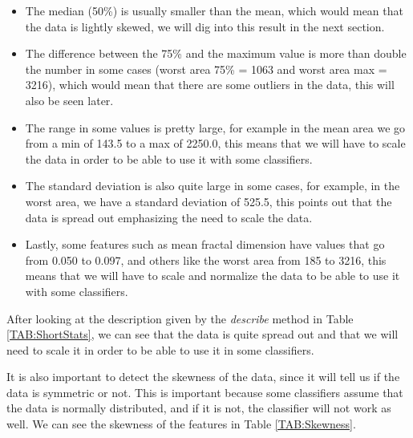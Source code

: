 \begin{itemize}
    \item The median (50\%) is usually smaller 
    than the mean, which would mean that the data is lightly skewed, we will dig into this result in the next section.
    \item The difference between the 75\% and the maximum value is more than double the number in some cases (worst area 75\% = 1063 and worst area max = 3216), which would mean that there are some outliers in the data, this will also be seen later.
    \item The range in some values is pretty large, for example in the mean area we go from a min of 143.5 to a max of 2250.0, this means that we will have to scale the data in order to be able to use it with some classifiers.
    \item The standard deviation is also quite large in some cases, for example, in the worst area, we have a standard deviation of 525.5, this points out that the data is spread out emphasizing the need to scale the data.
    \item Lastly, some features such as mean fractal dimension have values that go from 0.050 to 0.097, and others like the worst area from 185 to 3216, this means that we will have to scale and normalize the data to be able to use it with some classifiers.
\end{itemize}

After looking at the description given by the \textit{describe} method in Table \ref{TAB:ShortStats}, we can see that the data is quite spread out and that we will need to scale it in order to be able to use it in some classifiers.

It is also important to detect the skewness of the data, since it will tell us if the data is symmetric or not. This is important because some classifiers assume that the data is normally distributed, and if it is not, the classifier will not work as well. We can see the skewness of the features in Table \ref{TAB:Skewness}.

